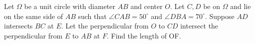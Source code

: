 Let $\Omega$ be a unit circle with diameter $A B$ and center $O$. Let $C, D$ be on $\Omega$ and lie on the same side of $A B$ such that $\angle C A B=50^{\circ}$ and $\angle D B A=70^{\circ}$. Suppose $A D$ intersects $B C$ at $E$. Let the perpendicular from $O$ to $C D$ intersect the perpendicular from $E$ to $A B$ at $F$. Find the length of OF.